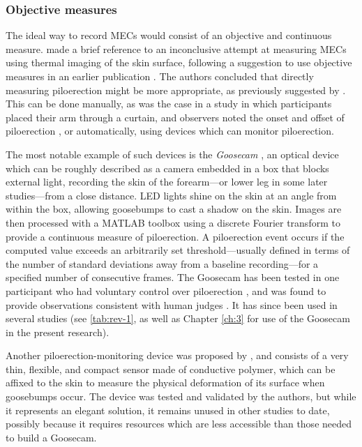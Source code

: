 \subsubsection{Objective measures}

The ideal way to record MECs would consist of an objective and continuous measure. \textcite{panksepp2002} made a brief reference to an inconclusive attempt at measuring MECs using thermal imaging of the skin surface, following a suggestion to use objective measures in an earlier publication \parencite{panksepp1995}. The authors concluded that directly measuring piloerection might be more appropriate, as previously suggested by \textcite{sloboda1991}. This can be done manually, as was the case in a study in which participants placed their arm through a curtain, and observers noted the onset and offset of piloerection \parencite{craig2005}, or automatically, using devices which can monitor piloerection.

The most notable example of such devices is the \emph{Goosecam} \parencite{benedek2010}, an optical device which can be roughly described as a camera embedded in a box that blocks external light, recording the skin of the forearm---or lower leg in some later studies---from a close distance. LED lights shine on the skin at an angle from within the box, allowing goosebumps to cast a shadow on the skin. Images are then processed with a MATLAB toolbox using a discrete Fourier transform to provide a continuous measure of piloerection. A piloerection event occurs if the computed value exceeds an arbitrarily set threshold---usually defined in terms of the number of standard deviations away from a baseline recording---for a specified number of consecutive frames. The Goosecam has been tested in one participant who had voluntary control over piloerection \parencite[for an interesting exploratory investigation of this phenomenon, see][]{heathers2018}, and was found to provide observations consistent with human judges \parencite{benedek2010}. It has since been used in several studies (see \autoref{tab:rev-1}, as well as Chapter \ref{ch:3} for use of the Goosecam in the present research).

Another piloerection-monitoring device was proposed by \textcite{kim2014}, and consists of a very thin, flexible, and compact sensor made of conductive polymer, which can be affixed to the skin to measure the physical deformation of its surface when goosebumps occur. The device was tested and validated by the authors, but while it represents an elegant solution, it remains unused in other studies to date, possibly because it requires resources which are less accessible than those needed to build a Goosecam.

